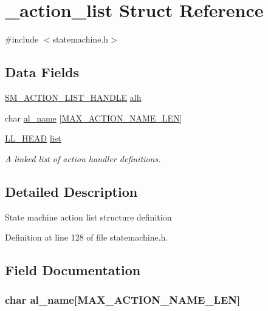 \hypertarget{struct__action__list}{\section{\-\_\-action\-\_\-list Struct Reference}
\label{struct__action__list}
}


{\ttfamily \#include $<$statemachine.\-h$>$}

\subsection*{Data Fields}
\begin{DoxyCompactItemize}
\item 
\hyperlink{statemachine_8h_a6f0ccd0b6cfa6e37d337d865442ee93b}{S\-M\-\_\-\-A\-C\-T\-I\-O\-N\-\_\-\-L\-I\-S\-T\-\_\-\-H\-A\-N\-D\-L\-E} \hyperlink{struct__action__list_ae71cc2f57d6453e22c531e08d61af27b}{alh}
\item 
char \hyperlink{struct__action__list_a7587b0e2d078e3eb9400df13d212ed2d}{al\-\_\-name} \mbox{[}\hyperlink{statemachine_8h_ac186e74b9bd4a8b61fde81aa6a9fb158}{M\-A\-X\-\_\-\-A\-C\-T\-I\-O\-N\-\_\-\-N\-A\-M\-E\-\_\-\-L\-E\-N}\mbox{]}
\item 
\hyperlink{struct_l_l___h_e_a_d}{L\-L\-\_\-\-H\-E\-A\-D} \hyperlink{struct__action__list_a973f3feaadef504857bd689dae19ebeb}{list}
\begin{DoxyCompactList}\small\item\em A linked list of action handler definitions. \end{DoxyCompactList}\end{DoxyCompactItemize}


\subsection{Detailed Description}
State machine action list structure definition 

Definition at line 128 of file statemachine.\-h.



\subsection{Field Documentation}
\hypertarget{struct__action__list_a7587b0e2d078e3eb9400df13d212ed2d}{
\subsubsection[{al\-\_\-name}]{\setlength{\rightskip}{0pt plus 5cm}char al\-\_\-name\mbox{[}{\bf M\-A\-X\-\_\-\-A\-C\-T\-I\-O\-N\-\_\-\-N\-A\-M\-E\-\_\-\-L\-E\-N}\mbox{]}}}\label{struct__action__list_a7587b0e2d078e3eb9400df13d212ed2d}


